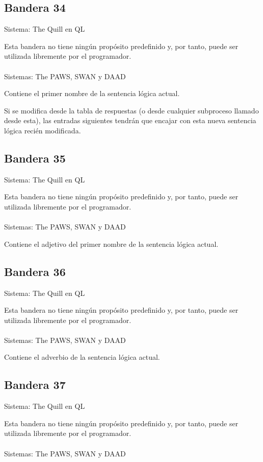 \documentclass[11pt, a5paper]{article}
\newcommand{\quill}{\textsf{The Quill}\xspace}
\newcommand{\paw}{\textsf{The PAWS}\xspace}
\newcommand{\swan}{\textsf{SWAN}\xspace}
\newcommand{\daad}{\textsf{DAAD}\xspace}
\newcommand{\sistema}[1]{\noindent Sistema: #1 \nopagebreak}
\newcommand{\sistemas}[1]{\noindent Sistemas: #1 \nopagebreak}
\begin{document}
\subsection{Bandera 34}

\sistema{\quill en QL}

Esta bandera no tiene ningún propósito predefinido y, por tanto, puede ser utilizada libremente por el programador.
\\\ \\
\sistemas{\paw, \swan y \daad}

Contiene el primer nombre de la sentencia lógica actual.

Si se modifica desde la tabla de respuestas (o desde cualquier subproceso llamado desde esta), las entradas siguientes tendrán que encajar con esta nueva sentencia lógica recién modificada.

\subsection{Bandera 35}

\sistema{\quill en QL}

Esta bandera no tiene ningún propósito predefinido y, por tanto, puede ser utilizada libremente por el programador.
\\\ \\
\sistemas{\paw, \swan y \daad}

Contiene el adjetivo del primer nombre de la sentencia lógica actual.

\subsection{Bandera 36}

\sistema{\quill en QL}

Esta bandera no tiene ningún propósito predefinido y, por tanto, puede ser utilizada libremente por el programador.
\\\ \\
\sistemas{\paw, \swan y \daad}

Contiene el adverbio de la sentencia lógica actual.

\subsection{Bandera 37}

\sistema{\quill en QL}

Esta bandera no tiene ningún propósito predefinido y, por tanto, puede ser utilizada libremente por el programador.
\\\ \\
\sistemas{\paw, \swan y \daad}
\end{document}

